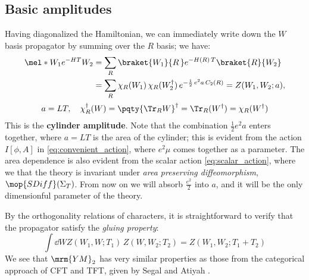 \documentclass[a4paper
	,10pt
]{article}
\newcommand{\YM}{{\ensuremath{\mrm{YM}_2}}\xspace}
\begin{document}
\subsection{Basic amplitudes}
	Having diagonalized the Hamiltonian, we can immediately write down the $W$ basis propagator by summing over the $R$ basis; we have:
	\begin{gather}
	\begin{aligned}
		\mel*{W_1}{e^{-HT}}{W_2}
		&= \sum_R
			\braket{W_1}{R\,}
			e^{-H(R)\,T}
			\braket{R}{W_2} \\
		&= \sum_R
			\chi_R(W_1)\,
			\chi_R(W_2^\dagger)\,
			e^{-\frac{1}{2}\,e^2 a\,C_2(R)}
		= Z(W_1,W_2;a),
	\end{aligned}
	\\[.3ex]
		a = LT,
	\quad
		\chi_R^\dagger(W)
		= \pqty{\Tr_R W}^\dagger
		= \Tr_R (W^\dagger)
		= \chi_R(W^\dagger)
	\end{gather}
	This is the \textbf{cylinder amplitude}. 
	Note that the combination $\frac{1}{2} e^2 a$ enters together, where $a = LT$ is the area of the cylinder; this is evident from the action $I[\phi,A]$ in \eqref{eq:convenient_action}, where $e^2 \mu$ comes together as a parameter. The area dependence is also evident from the scalar action \eqref{eq:scalar_action}, where we that the theory is invariant under \textit{area preserving diffeomorphism}, $\mop{SDiff}(\Sigma_T)$. From now on we will absorb $\frac{e^2}{2}$ into $a$, and it will be the only dimensionful parameter of the theory.
	
	By the orthogonality relations of characters, it is straightforward to verify that the propagator satisfy the \textit{gluing property}:
	\begin{equation}
		\int \dd{W}
			Z(W_1,W;T_1)\,Z(W,W_2;T_2)
		= Z(W_1,W_2;T_1 + T_2)
	\end{equation}
	We see that \YM has very similar properties as those from the categorical approach of CFT and TFT, given by Segal and Atiyah \cite{Segal1988,Atiyah1988}. 
	
\end{document}
